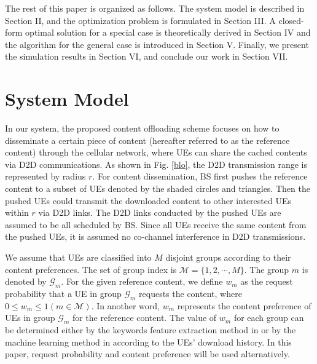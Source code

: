 \documentclass[12pt, draftclsnofoot, onecolumn]{IEEEtran}
\begin{document}
The rest of this paper is organized as follows. The system model is described in Section II, and the optimization problem is formulated in Section III. A closed-form optimal solution for a special case is theoretically derived in Section IV and the algorithm for the general case is introduced in Section V. Finally, we present the simulation results in Section VI, and conclude our work in Section VII.




\section{System Model}

In our system, the proposed content offloading scheme focuses on how to disseminate a certain piece of content (hereafter referred to as the reference content) through the cellular network, where UEs can share the cached contents via D2D communications.
As shown in Fig. \ref{blo}, the D2D transmission range is represented by radius $r$.
For content dissemination, BS first pushes the reference content to a subset of UEs denoted by the shaded circles and triangles.
Then the pushed UEs could transmit the downloaded content to other interested UEs within $r$ via D2D links.
The D2D links conducted by the pushed UEs are assumed to be all scheduled by BS.
Since all UEs receive the same content from the pushed UEs, it is assumed no co-channel interference in D2D transmissions\cite{Energy2016}.\footnotemark[1]



We assume that UEs are classified into $M$ disjoint groups according to their content preferences. The set of group index is $\mathcal{M}=\{1,2, \cdots ,M\}$. The group $m$ is denoted by $\mathcal{G}_m$.
For the given reference content, we define $w_m$ as the request probability that a UE in group $\mathcal{G}_m$ requests the content, where $0 \leq w_m \leq 1 ( m \in \mathcal{M})$. In another word, $w_m$ represents the content preference of UEs in group $\mathcal{G}_m$ for the reference content.
The value of $w_m$ for each group can be determined either by the keywords feature extraction method in \cite{li2014multiple} \cite{6928487} or by the machine learning method in \cite{chen2016echo} according to the UEs' download history.
In this paper, request probability and content preference will be used alternatively.
\end{document}
